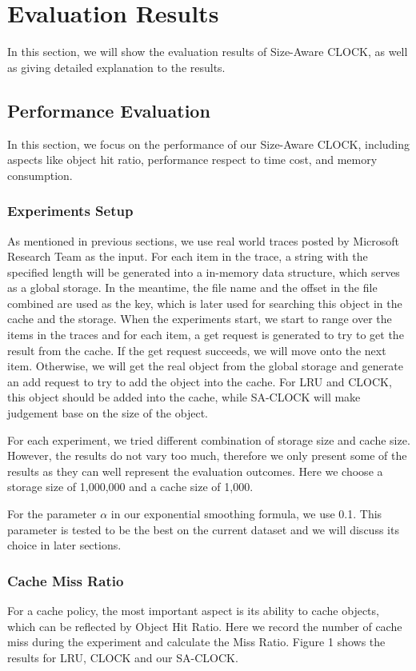 \documentclass[conference]{IEEEtran}
\begin{document}
\section{Evaluation Results}
In this section, we will show the evaluation results of Size-Aware CLOCK, as well as giving detailed explanation to the results.

\subsection{Performance Evaluation}
In this section, we focus on the performance of our Size-Aware CLOCK, including aspects like object hit ratio, performance respect to time cost, and memory consumption.

\subsubsection{Experiments Setup}
As mentioned in previous sections, we use real world traces posted by Microsoft Research Team as the input. For each item in the trace, a string with the specified length will be generated into a in-memory data structure, which serves as a global storage. In the meantime, the file name and the offset in the file combined are used as the key, which is later used for searching this object in the cache and the storage. 
When the experiments start, we start to range over the items in the traces and for each item, a get request is generated to try to get the result from the cache. If the get request succeeds, we will move onto the next item. Otherwise, we will get the real object from the global storage and generate an add request to try to add the object into the cache. For LRU and CLOCK, this object should be added into the cache, while SA-CLOCK will make judgement base on the size of the object.

For each experiment, we tried different combination of storage size and cache size. However, the results do not vary too much, therefore we only present some of the results as they can well represent the evaluation outcomes. Here we choose a storage size of 1,000,000 and a cache size of 1,000.

For the parameter $\alpha$ in our exponential smoothing formula, we use 0.1. This parameter is tested to be the best on the current dataset and we will discuss its choice in later sections.

\subsubsection{Cache Miss Ratio}
For a cache policy, the most important aspect is its ability to cache objects, which can be reflected by Object Hit Ratio. Here we record the number of cache miss during the experiment and calculate the Miss Ratio. Figure 1 shows the results for LRU, CLOCK and our SA-CLOCK. 
\end{document}
